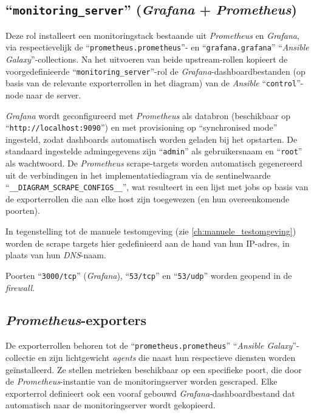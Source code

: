 \subsection{``\texttt{monitoring\_server}'' (\emph{Grafana} + \emph{Prometheus})}%
\label{subsec:rol_monitoring_server}

Deze rol installeert een monitoringstack bestaande uit \emph{Prometheus} en \emph{Grafana}, via respectievelijk de ``\texttt{prometheus.prometheus}''- en ``\texttt{grafana.grafana}'' ``\emph{Ansible Galaxy}''-collections. Na het uitvoeren van beide upstream-rollen kopieert de voorgedefinieerde ``\texttt{monitoring\_server}''-rol de \emph{Grafana}-dashboardbestanden (op basis van de relevante exporterrollen in het diagram) van de \emph{Ansible} ``\texttt{control}''-node naar de server.

\emph{Grafana} wordt geconfigureerd met \emph{Prometheus} als databron (beschikbaar op ``\texttt{http://localhost:9090}'') en met provisioning op ``synchronised mode'' ingesteld, zodat dashboards automatisch worden geladen bij het opstarten. De standaard ingestelde admingegevens zijn ``\texttt{admin}'' als gebruikersnaam en ``\texttt{root}'' als wachtwoord. De \emph{Prometheus} scrape-targets worden automatisch gegenereerd uit de verbindingen in het implementatiediagram via de sentinelwaarde ``\texttt{\_\_DIAGRAM\_SCRAPE\_CONFIGS\_\_}'', wat resulteert in een lijst met jobs op basis van de exporterrollen die aan elke host zijn toegewezen (en hun overeenkomende poorten).

In tegenstelling tot de manuele testomgeving (zie \autoref{ch:manuele_testomgeving}) worden de scrape targets hier gedefinieerd aan de hand van hun IP-adres, in plaats van hun \emph{DNS}-naam.

Poorten ``\texttt{3000/tcp}'' (\emph{Grafana}), ``\texttt{53/tcp}'' en ``\texttt{53/udp}'' worden geopend in de \emph{firewall}.

\subsection{\emph{Prometheus}-exporters}%
\label{subsec:rol_exporters}

De exporterrollen behoren tot de ``\texttt{prometheus.prometheus}'' ``\emph{Ansible Galaxy}''-collectie en zijn lichtgewicht \emph{agents} die naast hun respectieve diensten worden geïnstalleerd. Ze stellen metrieken beschikbaar op een specifieke poort, die door de \emph{Prometheus}-instantie van de monitoringserver worden gescraped. Elke exporterrol definieert ook een vooraf gebouwd \emph{Grafana}-dashboardbestand dat automatisch naar de monitoringserver wordt gekopieerd.

